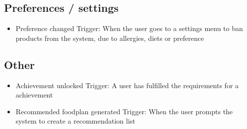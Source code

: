 \subsection{Preferences / settings}
\begin{itemize}
\item Preference changed
	\subitem Trigger: When the user goes to a settings menu to ban products from the system, due to allergies, diets or preference
\end{itemize}


\subsection{Other}
\begin{itemize}
\item Achievement unlocked
	\subitem Trigger: A user has fulfilled the requirements for a achievement  
\item Recommended foodplan generated
	\subitem Trigger: When the user prompts the system to create a recommendation list
\end{itemize}